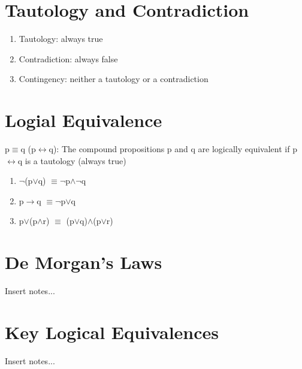 \documentclass{article}
\begin{document}
\section{Tautology and Contradiction}
\begin{enumerate}
    \item
    Tautology: always true
    \item
    Contradiction: always false
    \item
    Contingency: neither a tautology or a contradiction
\end{enumerate}

\section{Logial Equivalence}
p$\equiv$q (p$\longleftrightarrow$q): The compound propositions p and q are logically equivalent if p$\leftrightarrow$q is a tautology (always true)\\

\begin{enumerate}
    \item
    $\neg$(p$\vee$q) $\equiv \neg$p$\wedge \neg$q
    \item
    p$\to$q $\equiv \neg$p$\vee$q
    \item
    p$\vee$(p$\wedge$r) $\equiv$ (p$\vee$q)$\wedge$(p$\vee$r)
\end{enumerate}

\section{De Morgan's Laws}
Insert notes...

\section{Key Logical Equivalences}
Insert notes...
\end{document}
